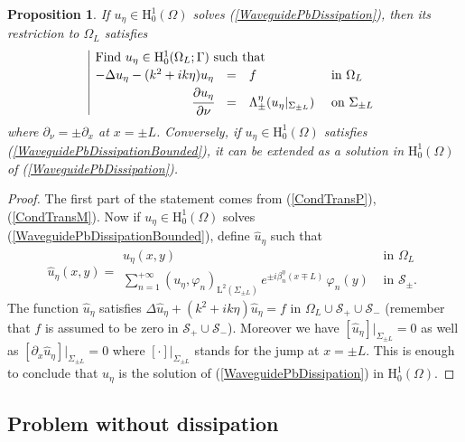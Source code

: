 \documentclass[11pt,a4paper]{report}
\newcommand{\dsp}{\displaystyle}
\newcommand{\Om}{\Omega}
\newcommand{\mrm}[1]{\mathrm{#1}}
\newcommand{\mL}{\mrm{L}}
\newcommand{\mH}{\mrm{H}}
\newtheorem{proposition}[theorem]{Proposition}
\begin{document}
\begin{proposition}
If $u_\eta\in\mH^1_0(\Om)$ solves (\ref{WaveguidePbDissipation}), then its restriction to $\Om_L$ satisfies
\begin{equation}\label{WaveguidePbDissipationBounded}
\begin{array}{|rcll}
\multicolumn{4}{|l}{\mbox{Find }u_\eta\in\mH^1_0(\Om_L;\Gamma)\mbox{ such that }}\\[2pt]
-\Delta u_\eta-(k^2+ik\eta)u_\eta&=&f&\mbox{ in }\Om_L \\[2pt]
\cfrac{\partial u_\eta}{\partial \nu} & = & \Lambda_\pm^\eta(u_\eta|_{\Sigma_{\pm L}}) &\mbox{ on }\Sigma_{\pm L}
\end{array}
\end{equation} 
where $\partial_{\nu}=\pm\partial_x$ at $x=\pm L$. Conversely, if  $u_\eta\in\mH^1_0(\Om)$ satisfies (\ref{WaveguidePbDissipationBounded}), it can be extended as a solution in $\mH^1_0(\Om)$ of (\ref{WaveguidePbDissipation}).
\end{proposition}
\begin{proof}
The first part of the statement comes from (\ref{CondTransP}), (\ref{CondTransM}). Now if $u_\eta\in\mH^1_0(\Om)$ solves (\ref{WaveguidePbDissipationBounded}), define $\hat{u}_\eta$ such that
\[
\hat{u}_\eta(x,y)=\begin{array}{|ll}
u_\eta(x,y) & \mbox{ in }\Om_L\\[2pt]
\dsp\sum_{n=1}^{+\infty} (u_\eta,\varphi_n)_{\mL^2(\Sigma_{\pm L})}\,e^{\pm i\beta_n^\eta (x\mp L)}\,\varphi_n(y)
 & \mbox{ in }\mathcal{S}_{\pm}.
\end{array}
\]
The function $\hat{u}_\eta$ satisfies $\Delta \hat{u}_\eta+(k^2+ik\eta)\hat{u}_\eta=f$ in $\Om_L\cup \mathcal{S}_+\cup \mathcal{S}_-$ (remember that $f$ is assumed to be zero in $\mathcal{S}_+\cup \mathcal{S}_-$). Moreover we have $[\hat{u}_\eta]|_{\Sigma_{\pm L}}=0$ as well as $[\partial_x \hat{u}_\eta]|_{\Sigma_{\pm L}}=0$ where $[\cdot]|_{\Sigma_{\pm L}}$ stands for the jump at $x=\pm L$. This is enough to conclude that $\hat{u}_\eta$ is the solution of (\ref{WaveguidePbDissipation}) in $\mH^1_0(\Om)$.
\end{proof}



\subsection{Problem without dissipation}\label{ParaLimiting}
\end{document}

